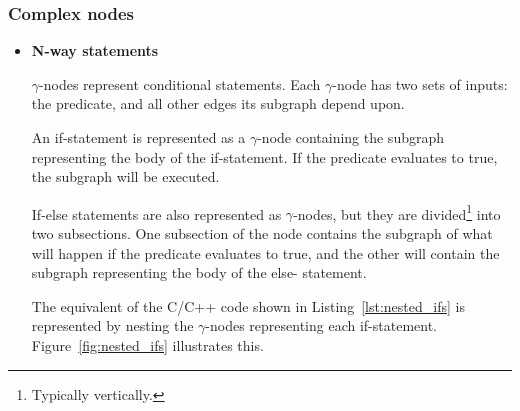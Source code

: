 \subsubsection{Complex nodes}

\begin{itemize}

\item \textbf{N-way statements}

\textit{$\gamma$}-nodes represent conditional statements. Each $\gamma$-node has
two sets of inputs: the predicate, and all other edges its subgraph depend upon.

An if-statement is represented as a $\gamma$-node containing the subgraph
representing the body of the if-statement. If the predicate evaluates to true,
the subgraph will be executed.

If-else statements are also represented as $\gamma$-nodes, but they are
divided\footnote{Typically vertically.} into two subsections. One subsection of
the node contains the subgraph of what will happen if the predicate evaluates to
true, and the other will contain the subgraph representing the body of the else-
statement.

The equivalent of the C/C++ code shown in Listing~\ref{lst:nested_ifs} is
represented by nesting the $\gamma$-nodes representing each if-statement.
Figure~\ref{fig:nested_ifs} illustrates this.


\end{itemize}
